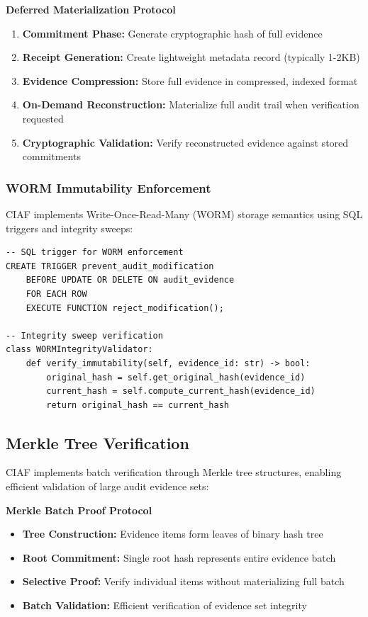 \documentclass[12pt,a4paper]{article}
\begin{document}
\begin{technicalbox}
\textbf{Deferred Materialization Protocol}
\begin{enumerate}
\item \textbf{Commitment Phase:} Generate cryptographic hash of full evidence
\item \textbf{Receipt Generation:} Create lightweight metadata record (typically 1-2KB)
\item \textbf{Evidence Compression:} Store full evidence in compressed, indexed format
\item \textbf{On-Demand Reconstruction:} Materialize full audit trail when verification requested
\item \textbf{Cryptographic Validation:} Verify reconstructed evidence against stored commitments
\end{enumerate}
\end{technicalbox}

\subsubsection{WORM Immutability Enforcement}

CIAF implements Write-Once-Read-Many (WORM) storage semantics using SQL triggers and integrity sweeps:

\begin{lstlisting}[caption=WORM Enforcement Implementation]
-- SQL trigger for WORM enforcement
CREATE TRIGGER prevent_audit_modification
    BEFORE UPDATE OR DELETE ON audit_evidence
    FOR EACH ROW
    EXECUTE FUNCTION reject_modification();

-- Integrity sweep verification
class WORMIntegrityValidator:
    def verify_immutability(self, evidence_id: str) -> bool:
        original_hash = self.get_original_hash(evidence_id)
        current_hash = self.compute_current_hash(evidence_id)
        return original_hash == current_hash
\end{lstlisting}

\subsection{Merkle Tree Verification}

CIAF implements batch verification through Merkle tree structures, enabling efficient validation of large audit evidence sets:

\begin{technicalbox}
\textbf{Merkle Batch Proof Protocol}
\begin{itemize}
\item \textbf{Tree Construction:} Evidence items form leaves of binary hash tree
\item \textbf{Root Commitment:} Single root hash represents entire evidence batch
\item \textbf{Selective Proof:} Verify individual items without materializing full batch
\item \textbf{Batch Validation:} Efficient verification of evidence set integrity
\end{itemize}
\end{technicalbox}
\end{document}
